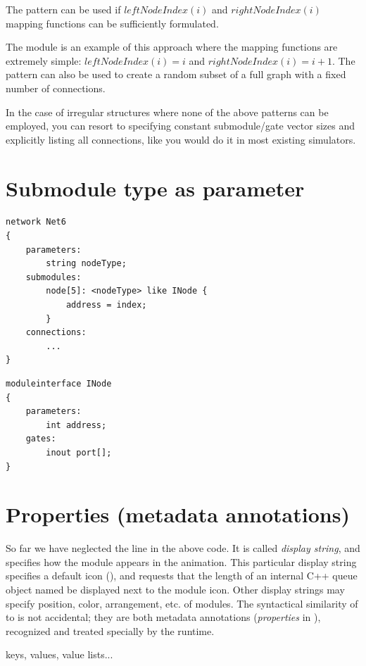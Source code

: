 The pattern can be used if $leftNodeIndex(i)$ and $rightNodeIndex(i)$
mapping functions can be sufficiently formulated.

The  module is an example of this approach where the mapping
functions are extremely simple: $leftNodeIndex(i)=i$ and $rightNodeIndex(i) = i+1$.
The pattern can also be used to create a random subset of a full
graph with a fixed number of connections.

In the case of irregular structures where none of the above patterns
can be employed, you can resort to specifying constant submodule/gate
vector sizes and explicitly listing all connections, like you
would do it in most existing simulators.





\section{Submodule type as parameter}

\begin{Verbatim}
network Net6
{
    parameters:
        string nodeType;
    submodules:
        node[5]: <nodeType> like INode {
            address = index;
        }
    connections:
        ...
}
\end{Verbatim}

\begin{Verbatim}
moduleinterface INode
{
    parameters:
        int address;
    gates:
        inout port[];
}
\end{Verbatim}


\section{Properties (metadata annotations)}

So far we have neglected the  line in the above code. It is called
\textit{display string}, and specifies how the module appears in the animation.
This particular display string specifies a default icon
(), and requests that the length of an internal C++ queue
object named  be displayed next to the module icon. Other display
strings may specify position, color, arrangement, etc. of modules. The
syntactical similarity of  to  is not accidental; they
are both metadata annotations (\textit{properties} in \opp), recognized and
treated specially by the runtime.

keys, values, value lists...

